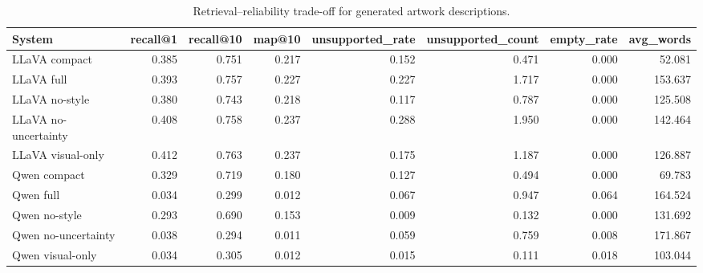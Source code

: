 \begin{table}
\caption{Retrieval--reliability trade-off for generated artwork descriptions.}
\label{tab:gala_tradeoff}
\begin{tabular}{lrrrrrrr}
\toprule
System & recall@1 & recall@10 & map@10 & unsupported_rate & unsupported_count & empty_rate & avg_words \\
\midrule
LLaVA compact & 0.385 & 0.751 & 0.217 & 0.152 & 0.471 & 0.000 & 52.081 \\
LLaVA full & 0.393 & 0.757 & 0.227 & 0.227 & 1.717 & 0.000 & 153.637 \\
LLaVA no-style & 0.380 & 0.743 & 0.218 & 0.117 & 0.787 & 0.000 & 125.508 \\
LLaVA no-uncertainty & 0.408 & 0.758 & 0.237 & 0.288 & 1.950 & 0.000 & 142.464 \\
LLaVA visual-only & 0.412 & 0.763 & 0.237 & 0.175 & 1.187 & 0.000 & 126.887 \\
Qwen compact & 0.329 & 0.719 & 0.180 & 0.127 & 0.494 & 0.000 & 69.783 \\
Qwen full & 0.034 & 0.299 & 0.012 & 0.067 & 0.947 & 0.064 & 164.524 \\
Qwen no-style & 0.293 & 0.690 & 0.153 & 0.009 & 0.132 & 0.000 & 131.692 \\
Qwen no-uncertainty & 0.038 & 0.294 & 0.011 & 0.059 & 0.759 & 0.008 & 171.867 \\
Qwen visual-only & 0.034 & 0.305 & 0.012 & 0.015 & 0.111 & 0.018 & 103.044 \\
\bottomrule
\end{tabular}
\end{table}
